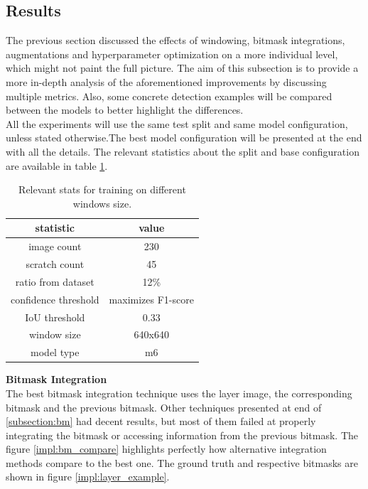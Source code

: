 \subsection{Results}
The previous section discussed the effects of windowing, bitmask integrations, augmentations and hyperparameter optimization on a more individual level, which might not paint the full picture. The aim of this subsection is to provide a more in-depth analysis of the aforementioned improvements by discussing multiple metrics. Also, some concrete detection examples will be compared between the models to better highlight the differences. \\
All the experiments will use the same test split and same model configuration, unless stated otherwise.The best model configuration will be presented at the end with all the details. The relevant statistics about the split and base configuration are available in table \ref{impl:test_split_stats}.

\begin{table}[!h]
  \centering
    \begin{tabular}{ ||c|c|||}
    \hline
    statistic & value \\ [0.5ex]
    \hline\hline
    image count & 230 \\
    scratch count & 45 \\
    ratio from dataset & 12\% \\
    confidence threshold & maximizes F1-score \\
    IoU threshold & 0.33 \\
    window size & 640x640 \\
    model type & m6 \\
    \hline
    \end{tabular}
  \caption{Relevant stats for training on different windows size.}
  \label{impl:test_split_stats}
\end{table}



\textbf{Bitmask Integration} \\
The best bitmask integration technique uses the layer image, the corresponding bitmask and the previous bitmask. Other techniques presented at end of \ref{subsection:bm} had decent results, but most of them failed at properly integrating the bitmask or accessing information from the previous bitmask. The figure \ref{impl:bm_compare} highlights perfectly how alternative integration methods compare to the best one. The ground truth and respective bitmasks are shown in figure \ref{impl:layer_example}.



